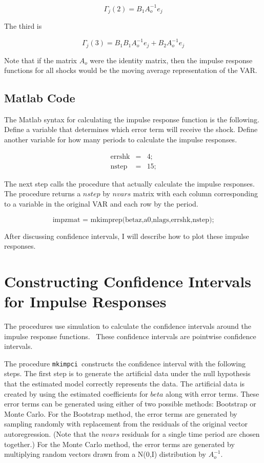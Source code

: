 \documentclass{article}
\begin{document}
\begin{equation*}
\Gamma _{j}(2)=B_{1}A_{o}^{-1}e_{j}
\end{equation*}

The third is

\begin{equation*}
\Gamma _{j}(3)=B_{1}B_{1}A_{o}^{-1}e_{j}+B_{2}A_{o}^{-1}e_{j}
\end{equation*}

Note that if the matrix $A_{o}$ were the identity matrix, then the impulse
response functions for all shocks would be the moving average representation
of the VAR.

\subsection{Matlab Code}

The Matlab syntax for calculating the impulse response function is the
following. Define a variable that determines which error term will receive
the shock. Define another variable for how many periods to calculate the
impulse responses.

\begin{eqnarray*}
\text{errshk} &=&\text{4;} \\
\text{nstep} &=&\text{15;}
\end{eqnarray*}

The next step calls the procedure that actually calculate the impulse
responses. The procedure returns a $nstep$ by $nvars$ matrix with each
column corresponding to a variable in the original VAR and each row by the
period.

\begin{equation*}
\text{impzmat = mkimprep(betaz,a0,nlags,errshk,nstep);}
\end{equation*}

After discussing confidence intervals, I will describe how to plot these
impulse responses.

\section{Constructing Confidence Intervals for Impulse Responses}

The procedures use simulation to calculate the confidence intervals around
the impulse response functions. \ These confidence intervals are pointwise
confidence intervals.

The procedure \texttt{mkimpci }constructs the confidence interval with the
following steps. The first step is to generate the artificial data under the
null hypothesis that the estimated model correctly represents the data. The
artificial data is created by using the estimated coefficients for $beta$
along with error terms. These error terms can be generated using either of
two possible methods: Bootstrap or Monte Carlo. For the Bootstrap method,
the error terms are generated by sampling randomly with replacement from the
residuals of the original vector autoregression. (Note that the $nvars$
residuals for a single time period are chosen together.) For the Monte Carlo
method, the error terms are generated by multiplying random vectors drawn
from a N(0,I) distribution by $A_{o}^{-1}$.
\end{document}
